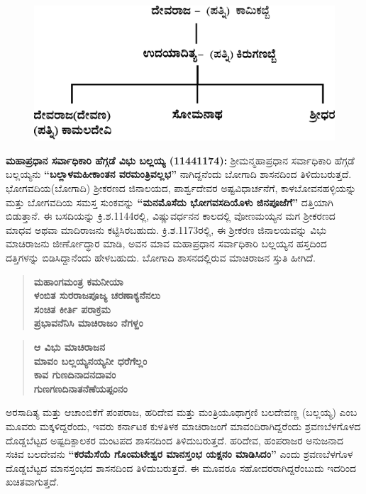\newpage

\begin{figure}[H]
\includegraphics[scale=1.15]{images/chap3/chap3fig15.jpeg}
\end{figure}

\textbf{ಮಹಾಪ್ರಧಾನ ಸರ್ವಾಧಿಕಾರಿ ಹೆಗ್ಗಡೆ ವಿಭು ಬಲ್ಲಯ್ಯ (1144\general{\enginline{-}}1174):} ಶ‍್ರೀಮನ್ಮಹಾಪ್ರಧಾನ ಸರ್ವಾಧಿಕಾರಿ ಹೆಗ್ಗಡೆ ಬಲ್ಲಯ್ಯನು \textbf{“ಬಲ್ಲಾಳಮಹೀಕಾಂತನ ವರಮಂತ್ರಿವಲ್ಲಭ”} ನಾಗಿದ್ದನೆಂದು ಬೋಗಾದಿ ಶಾಸನದಿಂದ ತಿಳಿದುಬರುತ್ತದೆ. ಭೋಗವದಿಯ(ಬೋಗಾದಿ) ಶ‍್ರೀಕರಣದ ಜಿನಾಲಯದ, ಪಾರ್ಶ್ವದೇವರ ಅಷ್ಟವಿಧಾರ್ಚನೆಗೆ, ಕಾಳಬೋವನಹಳ್ಳಿಯನ್ನು ಮತ್ತು ಬೋಗವದಿಯ ಸಮಸ್ತ ಸುಂಕವನ್ನು \textbf{“ಮನಮೊಸೆದು ಭೋಗವಸದಿಯೊಳು ಜಿನಪೂಜೆಗೆ”} ದತ್ತಿಯಾಗಿ ಬಿಡುತ್ತಾನೆ. ಈ ಬಸದಿಯನ್ನು ಕ್ರಿ.ಶ.1144ರಲ್ಲಿ, ವಿಷ್ಣುವರ್ಧನನ ಕಾಲದಲ್ಲಿ ವೋಣಮಯ್ಯನ ಮಗ ಶ‍್ರೀಕರಣದ ಮಾಧವ ಅಥವಾ ಮಾದಿರಾಜನು ಕಟ್ಟಿಸಿರಬಹುದು. ಕ್ರಿ.ಶ.1173ರಲ್ಲಿ, ಈ ಶ‍್ರೀಕರಣ ಜಿನಾಲಯವನ್ನು ವಿಭು ಮಾಚಿರಾಜನು ಜೀರ್ಣೋದ್ಧಾರ ಮಾಡಿ, ಅವನ ಮಾವ ಮಹಾಪ್ರಧಾನ ಸರ್ವಾಧಿಕಾರಿ ಬಲ್ಲಯ್ಯನ ಹಸ್ತದಿಂದ ದತ್ತಿಗಳನ್ನು ಬಿಡಿಸಿದ್ದಾನೆಂದು ಹೇಳಬಹುದು. ಬೋಗಾದಿ ಶಾಸನದಲ್ಲಿರುವ ಮಾಚಿರಾಜನ ಸ್ತುತಿ ಹೀಗಿದೆ.

\begin{verse}
\textbf{ಮಹಾಂಗಮಂತ್ರ ಕಮನೀಯಾ} \\\textbf{ ಳಂಬಿತ ಸುರರಾಜಪೂಜ್ಯ ಚರಣಾಕ್ಯನೆನಲು} \\\textbf{ ಸಂಚಿತ ಕೀರ್ತಿ ಪರಾಕ್ರಮ}\\\textbf{ ಪ್ರಭಾವನೆನಿಸಿ ಮಾಚಿರಾಜಂ ನೆಗಳ್ದಂ}
\end{verse}

\begin{verse}
\textbf{ಆ ವಿಭು ಮಾಚಿರಾಜನ} \\\textbf{ ಮಾವಂ ಬಲ್ಲಯ್ಯನಯ್ಯನೀ ಧರೆಗೆಲ್ಲಂ} \\\textbf{ಕಾವ ಗುಣದಿನಾದನದಾವಂ} \\\textbf{ ಗುಣಗಣದಿನಾತನೆಣೆಯಪ್ಪಂನಂ}
\end{verse}

ಅರಸಾದಿತ್ಯ ಮತ್ತು ಆಚಾಂಬಿಕೆಗೆ ಪಂಪರಾಜ, ಹರಿದೇವ ಮತ್ತು ಮಂತ್ರಿಯೂಥಾಗ್ರಣಿ ಬಲದೇವಣ್ಣ (ಬಲ್ಲಯ್ಯ) ಎಂಬ ಮೂವರು ಮಕ್ಕಳಿದ್ದರೆಂದು, ಇವರು ಕರ್ನಾಟಕ ಕುಳತಿಳಕ ಮಾಚಿರಾಜಂಗೆ ಮಾವಂದಿರಾಗಿದ್ದರೆಂದು ಶ್ರವಣಬೆಳಗೊಳದ ದೊಡ್ಡಬೆಟ್ಟದ ಅಷ್ಟದಿಕ್ಪಾಲಕರ ಮಂಟಪದ ಶಾಸನದಿಂದ ತಿಳಿದುಬರುತ್ತದೆ. ಹರಿದೇವ, ಹಂಪರಾಜರ ಅನುಜನಾದ ಸಚಿವ ಬಲದೇವನು \textbf{“ಕರಮೆಸೆಯೆ ಗೊಂಮಟೇಶ್ವರ ಮಾನಸ್ತಂಭ ಯಕ್ಷನಂ ಮಾಡಿಸಿದಂ”} ಎಂದು ಶ್ರವಣಬೆಳಗೊಳ ದೊಡ್ಡಬೆಟ್ಟದ ಮಾನಸ್ತಂಭದ ಶಾಸನದಿಂದ ತಿಳಿದುಬರುತ್ತದೆ. ಈ ಮೂವರೂ ಸಹೋದರರಾಗಿದ್ದರೆಂಬುದು ಇದರಿಂದ ಖಚಿತವಾಗುತ್ತದೆ.

